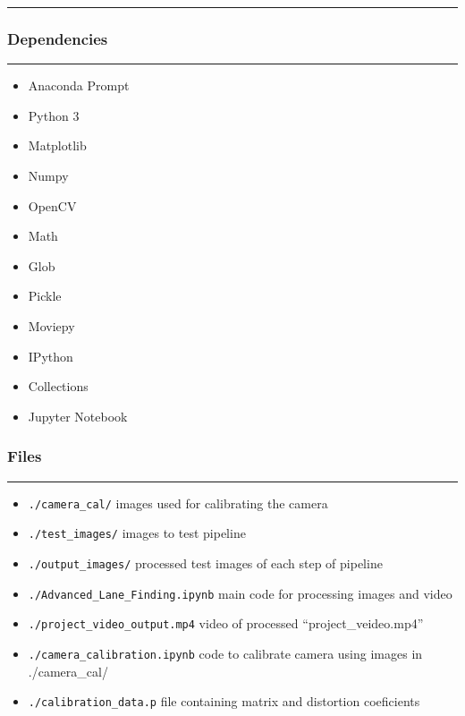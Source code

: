 \documentclass[11pt]{article}
\providecommand{\tightlist}{%
      \setlength{\itemsep}{0pt}\setlength{\parskip}{0pt}}
\begin{document}
\begin{center}\rule{0.5\linewidth}{\linethickness}\end{center}

\hypertarget{dependencies}{%
\subsubsection{Dependencies}\label{dependencies}}

\begin{center}\rule{0.5\linewidth}{\linethickness}\end{center}

\begin{itemize}
\tightlist
\item
  Anaconda Prompt
\item
  Python 3
\item
  Matplotlib
\item
  Numpy
\item
  OpenCV
\item
  Math
\item
  Glob
\item
  Pickle
\item
  Moviepy
\item
  IPython
\item
  Collections
\item
  Jupyter Notebook
\end{itemize}

\hypertarget{files}{%
\subsubsection{Files}\label{files}}

\begin{center}\rule{0.5\linewidth}{\linethickness}\end{center}

\begin{itemize}
\item
  \texttt{./camera\_cal/} \textbar{} images used for calibrating the
  camera
\item
  \texttt{./test\_images/} \textbar{} images to test pipeline
\item
  \texttt{./output\_images/} \textbar{} processed test images of each
  step of pipeline
\item
  \texttt{./Advanced\_Lane\_Finding.ipynb} \textbar{} main code for
  processing images and video
\item
  \texttt{./project\_video\_output.mp4} \textbar{} video of processed
  ``project\_veideo.mp4''
\item
  \texttt{./camera\_calibration.ipynb} \textbar{} code to calibrate
  camera using images in ./camera\_cal/
\item
  \texttt{./calibration\_data.p} \textbar{} file containing matrix and
  distortion coeficients
\end{itemize}
\end{document}
